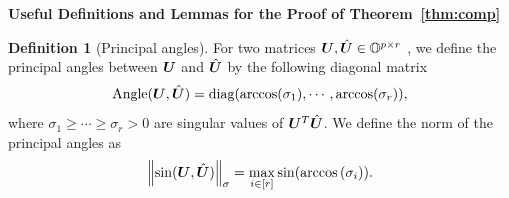 \documentclass[lettersize,onecolumn,journal]{IEEEtran}
\theoremstyle{definition}
\theoremstyle{definition}
\newtheorem{defn}{Definition}
\newcommand{\of}[1]{\left(#1\right)}
\def\fixme#1#2{\textbf{\color{red}[FIXME (#1): #2]}}
\begin{document}
{\bf Useful Definitions and Lemmas for the Proof of Theorem~\ref{thm:comp}} 
\begin{defn}[Principal angles] For two matrices $\bm{U}, \hat {\bm{U}} \in \mathbb{O}^{p \times r}$ %
, we define the principal angles between $\bm{U}$ and $\hat {\bm{U}}$ by the following diagonal matrix
\begin{equation}
    \text{Angle}(\bm{U}, \hat {\bm{U}}) = \text{diag}( \arccos(\sigma_1), \cdots, \arccos (\sigma_r) ),
\end{equation}
where $\sigma_1 \geq \cdots \geq \sigma_r>0$ are singular values of $\bm{U}^T \hat {\bm{U}}$. 
We define the norm of the principal angles as 
\begin{equation}
     \onorm{\sin(\mU, \hat \mU)}_{\sigma} = \max_{i \in [r]} \sin ( \arccos \of{ \sigma_i} ).
\end{equation}




\end{defn}



\end{document}
